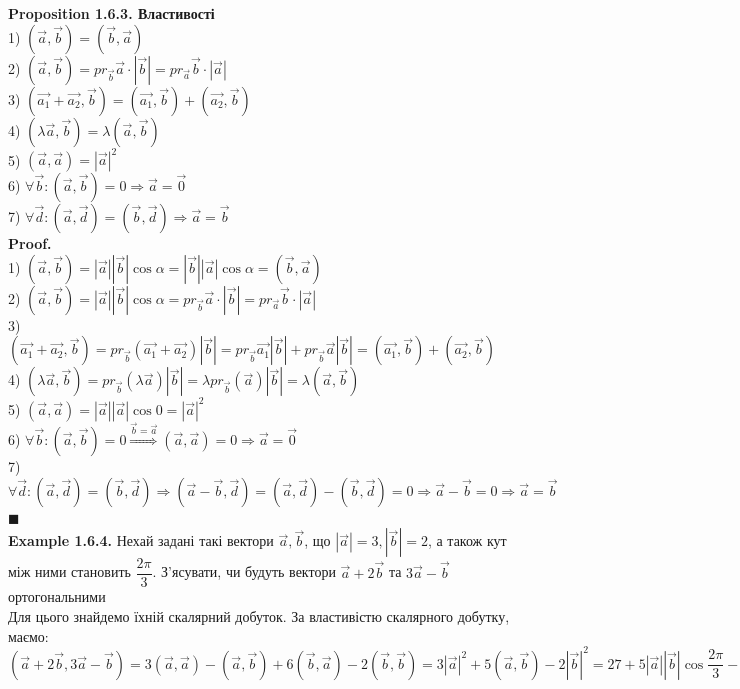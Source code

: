 \documentclass[a4paper, 14pt]{extarticle}
\def\ex#1{\textbf{Example {#1}}}
\def\prp#1{\textbf{Proposition {#1}}}
\def\proof{\textbf{Proof.}\\}
\def\bigline{\vspace{5mm}\\}
\def\qed{$\blacksquare$}
\begin{document}
	\prp{1.6.3. Властивості}\\
	1) $(\vec{a}, \vec{b}) = (\vec{b}, \vec{a})$\\
	2) $(\vec{a}, \vec{b}) = pr_{\vec{b}} \vec{a} \cdot |\vec{b}| = pr_{\vec{a}} \vec{b} \cdot |\vec{a}|$\\
	3) $(\vec{a_1}+\vec{a_2}, \vec{b}) = (\vec{a_1}, \vec{b}) + (\vec{a_2}, \vec{b})$\\
	4) $(\lambda \vec{a}, \vec{b}) = \lambda (\vec{a}, \vec{b})$\\
	5) $(\vec{a}, \vec{a}) = |\vec{a}|^2$\\
	6) $\forall \vec{b}: (\vec{a}, \vec{b}) = 0 \Rightarrow \vec{a} = \vec{0}$\\
	7) $\forall \vec{d}: (\vec{a}, \vec{d}) = (\vec{b}, \vec{d}) \Rightarrow \vec{a} = \vec{b}$\\
	\proof
	1) $(\vec{a}, \vec{b}) = |\vec{a}| |\vec{b}| \cos \alpha = |\vec{b}| |\vec{a}| \cos \alpha = (\vec{b}, \vec{a})$\bigline
	2) $(\vec{a}, \vec{b}) = |\vec{a}| |\vec{b}| \cos \alpha = pr_{\vec{b}} \vec{a} \cdot |\vec{b}| = pr_{\vec{a}} \vec{b} \cdot |\vec{a}|$\bigline
	3) $(\vec{a_1}+\vec{a_2}, \vec{b}) = pr_{\vec{b}} (\vec{a_1} + \vec{a_2}) |\vec{b}| = pr_{\vec{b}} \vec{a_1} |\vec{b}| + pr_{\vec{b}} \vec{a} |\vec{b}| = (\vec{a_1}, \vec{b}) + (\vec{a_2}, \vec{b})$\bigline
	4) $(\lambda \vec{a}, \vec{b}) = pr_{\vec{b}} (\lambda \vec{a}) |\vec{b}| = \lambda pr_{\vec{b}} (\vec{a}) |\vec{b}| = \lambda (\vec{a}, \vec{b})$\bigline
	5) $(\vec{a}, \vec{a}) = |\vec{a}| |\vec{a}| \cos 0 = |\vec{a}|^2$\bigline
	6) $\forall \vec{b}: (\vec{a}, \vec{b}) = 0 \overset{\vec{b} = \vec{a}}{\Rightarrow} (\vec{a}, \vec{a}) = 0 \Rightarrow \vec{a} = \vec{0}$ \bigline
	7) $\forall \vec{d}: (\vec{a}, \vec{d}) = (\vec{b}, \vec{d}) \Rightarrow (\vec{a}-\vec{b}, \vec{d}) = (\vec{a}, \vec{d}) - (\vec{b}, \vec{d}) = 0 \Rightarrow \vec{a} - \vec{b} = 0 \Rightarrow \vec{a} = \vec{b}$ \qed
	\bigline
	\ex{1.6.4.} Нехай задані такі вектори $\vec{a}, \vec{b}$, що $|\vec{a}| = 3, |\vec{b}| = 2$, а також кут між ними становить $\dfrac{2 \pi}{3}$. З'ясувати, чи будуть вектори $\vec{a}+2 \vec{b}$ та $3 \vec{a} - \vec{b}$ ортогональними\\
	Для цього знайдемо їхній скалярний добуток.
	За властивістю скалярного добутку, маємо:\\
	$(\vec{a} + 2 \vec{b}, 3 \vec{a} - \vec{b}) = 3 (\vec{a}, \vec{a}) - (\vec{a}, \vec{b}) + 6 (\vec{b}, \vec{a}) - 2 (\vec{b}, \vec{b}) = 3 |\vec{a}|^2 + 5 (\vec{a}, \vec{b}) - 2 |\vec{b}|^2 = 27 + 5 |\vec{a}| |\vec{b}| \cos \dfrac{2 \pi}{3} - 8 = 4$\\
\end{document}
